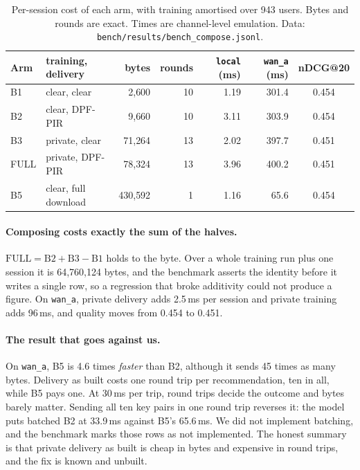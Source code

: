 \begin{table}[t]
\centering
\small
\caption{Per-session cost of each arm, with training amortised over 943 users.
Bytes and rounds are exact. Times are channel-level emulation. Data:
\texttt{bench/results/bench\_compose.jsonl}.}
\label{tab:compose}
\begin{tabular}{@{}llrrrrc@{}}
\toprule
Arm & training, delivery & bytes & rounds & \texttt{local} (ms) &
  \texttt{wan\_a} (ms) & nDCG@20 \\
\midrule
B1   & clear, clear         & 2{,}600   & 10 & 1.19 & 301.4 & 0.454 \\
B2   & clear, DPF-PIR       & 9{,}660   & 10 & 3.11 & 303.9 & 0.454 \\
B3   & private, clear       & 71{,}264  & 13 & 2.02 & 397.7 & 0.451 \\
FULL & private, DPF-PIR     & 78{,}324  & 13 & 3.96 & 400.2 & 0.451 \\
B5   & clear, full download & 430{,}592 & 1  & 1.16 & 65.6  & 0.454 \\
\bottomrule
\end{tabular}
\end{table}

\paragraph{Composing costs exactly the sum of the halves.} $\mathrm{FULL} =
\mathrm{B2} + \mathrm{B3} - \mathrm{B1}$ holds to the byte. Over a whole training
run plus one session it is 64{,}760{,}124 bytes, and the benchmark asserts the
identity before it writes a single row, so a regression that broke additivity
could not produce a figure. On \texttt{wan\_a}, private delivery adds 2.5\,ms per
session and private training adds 96\,ms, and quality moves from 0.454 to 0.451.

\paragraph{The result that goes against us.} On \texttt{wan\_a}, B5 is 4.6 times
\emph{faster} than B2, although it sends 45 times as many bytes. Delivery as
built costs one round trip per recommendation, ten in all, while B5 pays one. At
30\,ms per trip, round trips decide the outcome and bytes barely matter.
Sending all ten key pairs in one round trip reverses it: the model puts batched
B2 at 33.9\,ms against B5's 65.6\,ms. We did not implement batching, and the
benchmark marks those rows as not implemented. The honest summary is that
private delivery as built is cheap in bytes and expensive in round trips, and the
fix is known and unbuilt.

